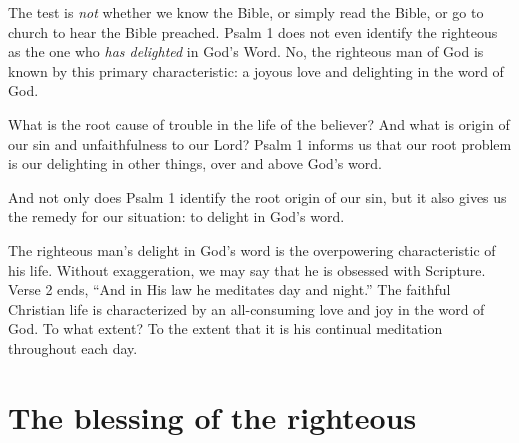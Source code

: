 \documentclass[a5paper]{book}
\begin{document}
The test is \emph{not} whether we know the Bible,
    or simply read the Bible,
    or go to church to hear the Bible preached.
Psalm 1 does not even identify the righteous as the one
    who \emph{has delighted} in God's Word.
No, the righteous man of God is known by this primary characteristic:
    a joyous love and delighting in the word of God.

What is the root cause of trouble in the life of the believer?
And what is origin of our sin and unfaithfulness to our Lord?
Psalm 1 informs us that our root problem is our delighting in other things,
    over and above God's word.

And not only does Psalm 1 identify the root origin of our sin,
    but it also gives us the remedy for our situation:
    to delight in God's word.

The righteous man's delight in God's word is the overpowering characteristic
    of his life.
Without exaggeration, we may say that he is obsessed with Scripture.
Verse 2 ends, ``And in His law he meditates day and night.''
The faithful Christian life is characterized by
    an all-consuming love and joy in the word of God.
To what extent?
To the extent that it is his continual meditation throughout each day.
    
\section{The blessing of the righteous}
\end{document}

